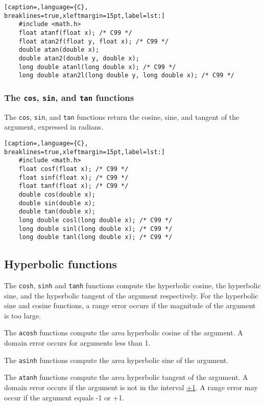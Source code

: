 \lstset{basicstyle=\scriptsize, numbers=left, captionpos=b, tabsize=4}
\begin{lstlisting}[caption=,language={C},
breaklines=true,xleftmargin=15pt,label=lst:]
	#include <math.h>
	float atanf(float x); /* C99 */
	float atan2f(float y, float x); /* C99 */
	double atan(double x);
	double atan2(double y, double x);
	long double atanl(long double x); /* C99 */
	long double atan2l(long double y, long double x); /* C99 */
\end{lstlisting}

\subsubsection{The \texttt{cos}, \texttt{sin}, and \texttt{tan} functions}
The \texttt{cos}, \texttt{sin}, and \texttt{tan} functions return the cosine,
sine, and tangent of the argument, expressed in radians.

\lstset{basicstyle=\scriptsize, numbers=left, captionpos=b, tabsize=4}
\begin{lstlisting}[caption=,language={C},
breaklines=true,xleftmargin=15pt,label=lst:]
	#include <math.h>
	float cosf(float x); /* C99 */
	float sinf(float x); /* C99 */
	float tanf(float x); /* C99 */
	double cos(double x);
	double sin(double x);
	double tan(double x);
	long double cosl(long double x); /* C99 */
	long double sinl(long double x); /* C99 */
	long double tanl(long double x); /* C99 */
\end{lstlisting}

\subsection{Hyperbolic functions}
The \texttt{cosh}, \texttt{sinh} and \texttt{tanh} functions compute the
hyperbolic cosine, the hyperbolic sine, and the hyperbolic tangent of the
argument respectively. For the hyperbolic sine and cosine functions, a range
error occurs if the magnitude of the argument is too large.

The \texttt{acosh} functions compute the area hyperbolic cosine of the
argument. A domain error occurs for arguments less than 1.

The \texttt{asinh} functions compute the area hyperbolic sine of the argument.

The \texttt{atanh} functions compute the area hyperbolic tangent of the
argument. A domain error occurs if the argument is not in the interval
\href{-1,}{+1}. A range error may occur if the argument equals -1 or +1.

